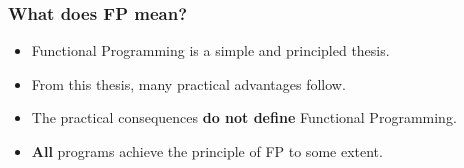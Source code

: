 \begin{frame}
\frametitle{What does FP mean?}
\begin{itemize}
  \item<1-> Functional Programming is a simple and principled thesis.
  \item<1-> From this thesis, many practical advantages follow.
  \item<2-> The practical consequences \textbf{do not define} Functional Programming.
  \item<3-> \textbf{All} programs achieve the principle of FP to some extent.
\end{itemize}
\end{frame}
